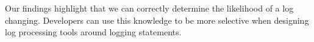 Our findings highlight that we can correctly determine the likelihood of a log changing. Developers can use this knowledge to be more selective when designing log processing tools around logging statements. 




